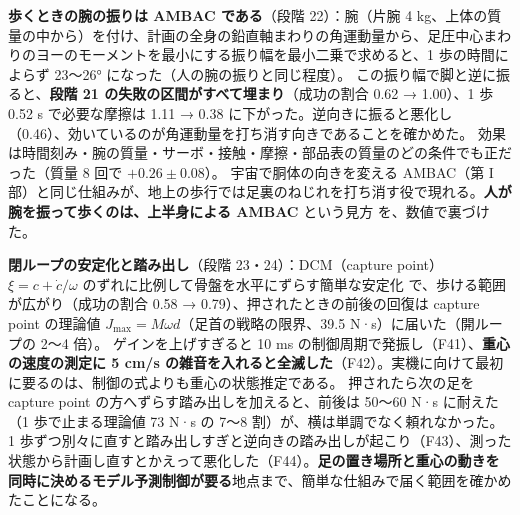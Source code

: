 \documentclass[paper=a4paper,fontsize=10pt,twocolumn,column_gap=2zw,line_length=24zw,number_of_lines=46,head_space=20mm]{jlreq}
\begin{document}
\textbf{歩くときの腕の振りは AMBAC である}（段階 22）：腕（片腕 4 kg、上体の質量の中から）を付け、計画の全身の鉛直軸まわりの角運動量から、足圧中心まわりのヨーのモーメントを最小にする振り幅を最小二乗で求めると、1 歩の時間によらず 23〜26° になった（人の腕の振りと同じ程度）。
この振り幅で脚と逆に振ると、\textbf{段階 21 の失敗の区間がすべて埋まり}（成功の割合 0.62 → 1.00）、1 歩 0.52 s で必要な摩擦は 1.11 → 0.38 に下がった。逆向きに振ると悪化し（0.46）、効いているのが角運動量を打ち消す向きであることを確かめた。
効果は時間刻み・腕の質量・サーボ・接触・摩擦・部品表の質量のどの条件でも正だった（質量 8 回で $+0.26\pm0.08$）。
宇宙で胴体の向きを変える AMBAC（第 I 部）と同じ仕組みが、地上の歩行では足裏のねじれを打ち消す役で現れる。\textbf{人が腕を振って歩くのは、上半身による AMBAC} という見方 \cite{collins2009} を、数値で裏づけた。

\textbf{閉ループの安定化と踏み出し}（段階 23・24）：DCM（capture point）$\xi = c + \dot c/\omega$ のずれに比例して骨盤を水平にずらす簡単な安定化 \cite{englsberger2015} で、歩ける範囲が広がり（成功の割合 0.58 → 0.79）、押されたときの前後の回復は capture point \cite{pratt2006} の理論値 $J_\mathrm{max}=M\omega d$（足首の戦略の限界、39.5 N·s）に届いた（開ループの 2〜4 倍）。
ゲインを上げすぎると 10 ms の制御周期で発振し（F41）、\textbf{重心の速度の測定に 5 cm/s の雑音を入れると全滅した}（F42）。実機に向けて最初に要るのは、制御の式よりも重心の状態推定である。
押されたら次の足を capture point の方へずらす踏み出しを加えると、前後は 50〜60 N·s に耐えた（1 歩で止まる理論値 73 N·s の 7〜8 割）が、横は単調でなく頼れなかった。
1 歩ずつ別々に直すと踏み出しすぎと逆向きの踏み出しが起こり（F43）、測った状態から計画し直すとかえって悪化した（F44）。\textbf{足の置き場所と重心の動きを同時に決めるモデル予測制御が要る}地点まで、簡単な仕組みで届く範囲を確かめたことになる。
\end{document}
